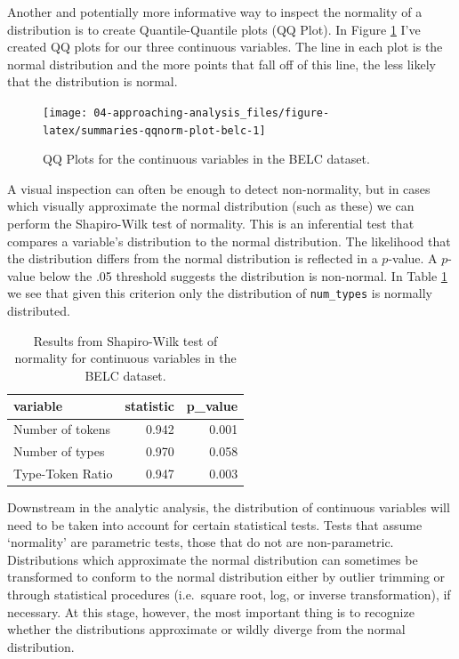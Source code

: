 \documentclass[
]{article}
\begin{document}
Another and potentially more informative way to inspect the normality of a distribution is to create Quantile-Quantile plots (QQ Plot). In Figure \ref{fig:summaries-qqnorm-plot-belc} I've created QQ plots for our three continuous variables. The line in each plot is the normal distribution and the more points that fall off of this line, the less likely that the distribution is normal.

\begin{figure}

{\centering \texttt{[image: 04-approaching-analysis\_files/figure-latex/summaries-qqnorm-plot-belc-1]} 

}

\caption{QQ Plots for the continuous variables in the BELC dataset.}\label{fig:summaries-qqnorm-plot-belc}
\end{figure}

A visual inspection can often be enough to detect non-normality, but in cases which visually approximate the normal distribution (such as these) we can perform the Shapiro-Wilk test of normality. This is an inferential test that compares a variable's distribution to the normal distribution. The likelihood that the distribution differs from the normal distribution is reflected in a \(p\)-value. A \(p\)-value below the .05 threshold suggests the distribution is non-normal. In Table \ref{tab:summaries-normality-test-belc} we see that given this criterion only the distribution of \texttt{num\_types} is normally distributed.

\begin{table}

\caption{\label{tab:summaries-normality-test-belc}Results from Shapiro-Wilk test of normality for continuous variables in the BELC dataset.}
\centering
\begin{tabular}[t]{lrr}
\toprule
variable & statistic & p\_value\\
\midrule
Number of tokens & 0.942 & 0.001\\
Number of types & 0.970 & 0.058\\
Type-Token Ratio & 0.947 & 0.003\\
\bottomrule
\end{tabular}
\end{table}

Downstream in the analytic analysis, the distribution of continuous variables will need to be taken into account for certain statistical tests. Tests that assume `normality' are parametric tests, those that do not are non-parametric. Distributions which approximate the normal distribution can sometimes be transformed to conform to the normal distribution either by outlier trimming or through statistical procedures (i.e.~square root, log, or inverse transformation), if necessary. At this stage, however, the most important thing is to recognize whether the distributions approximate or wildly diverge from the normal distribution.
\end{document}
